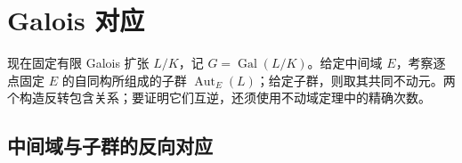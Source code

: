 
\section{Galois 对应}
\label{b1:sec:1902}

%
%

现在固定有限 Galois 扩张 \(L/K\)，记 \(G=\operatorname{Gal}(L/K)\)。给定中间域 \(E\)，考察逐点固定 \(E\) 的自同构所组成的子群 \(\operatorname{Aut}_E(L)\)；给定子群，则取其共同不动元。两个构造反转包含关系；要证明它们互逆，还须使用不动域定理中的精确次数。

\subsection{中间域与子群的反向对应}
\label{b1:subsec:1902:01}

